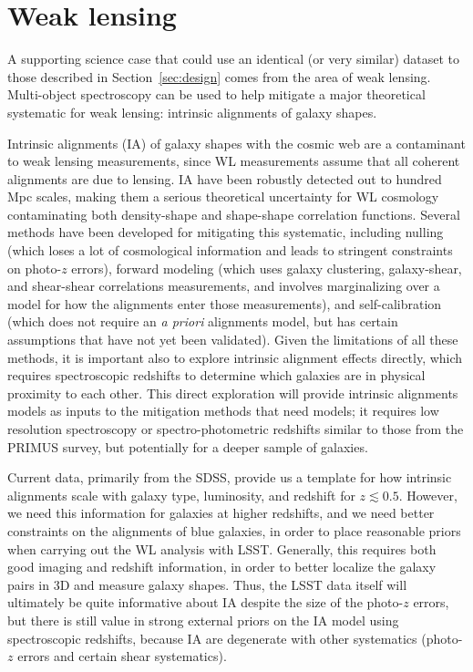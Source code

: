 \section{Weak lensing}
\label{sec:wl}

A supporting science case that could use an identical (or very similar) dataset to those described
in Section~\ref{sec:design} comes from the area of weak lensing.  Multi-object spectroscopy can be
used to help mitigate a major theoretical systematic for weak lensing: intrinsic alignments of galaxy
shapes.

Intrinsic alignments (IA) of galaxy shapes with the cosmic web are a contaminant to weak lensing
measurements, since WL measurements assume that all coherent alignments are due to lensing. IA have
been robustly detected out to hundred Mpc scales, making them a serious theoretical uncertainty for
WL cosmology contaminating both density-shape and shape-shape correlation functions.  Several
methods have been developed for mitigating this systematic, including nulling (which loses a lot of
cosmological information and leads to stringent constraints on photo-$z$ errors), forward modeling
(which uses galaxy clustering, galaxy-shear, and shear-shear correlations measurements, and involves
marginalizing over a model for how the alignments enter those measurements), and self-calibration
(which does not require an {\em a priori} alignments model, but has certain assumptions that have
not yet been validated).  Given the limitations of all these methods, it is important also to
explore intrinsic alignment effects directly, which requires spectroscopic redshifts to determine
which galaxies are in physical proximity to each other.  This direct exploration will provide
intrinsic alignments models as inputs to the mitigation methods that need models; it requires low
resolution spectroscopy or spectro-photometric redshifts similar to those from the PRIMUS
survey, but potentially for a deeper sample of galaxies.


Current data, primarily from the SDSS, provide us a template for how intrinsic alignments scale with
galaxy type, luminosity, and redshift for $z\lesssim 0.5$.  However, we need this information for
galaxies at higher redshifts, and we need better constraints on the alignments of blue galaxies, in
order to place reasonable priors when carrying out the WL analysis with LSST. Generally, this
requires both good imaging and redshift information, in order to better localize the galaxy pairs in
3D and measure galaxy shapes.  Thus, the LSST data itself will ultimately be quite informative about
IA despite the size of the photo-$z$ errors, but there is still value in strong external priors on
the IA model using spectroscopic redshifts, because IA are degenerate with other systematics (photo-$z$ errors and certain shear
systematics).

